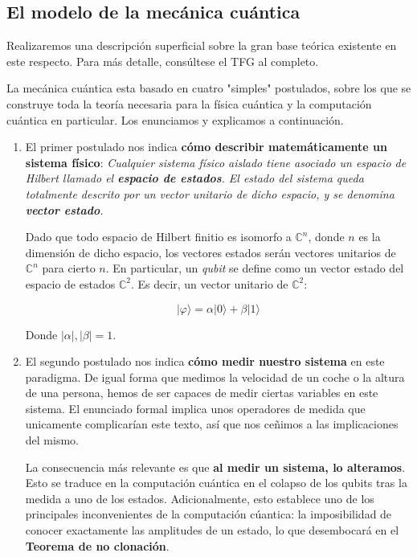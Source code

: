 \documentclass[11pt]{article}
\newcommand*{\C}{\mathds{C}}
\newcommand*{\ra}{\rangle}
\begin{document}
\subsection{El modelo de la mecánica cuántica}

Realizaremos una descripción superficial sobre la gran base teórica existente en este respecto. Para más detalle, consúltese el TFG al completo.

La mecánica cuántica esta basado en cuatro "simples" postulados, sobre los que se construye toda la teoría necesaria para la física cuántica y la computación cuántica en particular. Los enunciamos y explicamos a continuación.

\begin{enumerate}
	\item El primer postulado nos indica \textbf{cómo describir matemáticamente un sistema físico}: \emph{Cualquier sistema físico aislado tiene asociado un espacio de Hilbert llamado el \textbf{espacio de estados}. El estado del sistema queda totalmente descrito por un vector unitario de dicho espacio, y se denomina \textbf{vector estado}.}
	
	Dado que todo espacio de Hilbert finitio es isomorfo a $\C^n$, donde $n$ es la dimensión de dicho espacio, los vectores estados serán vectores unitarios de $\C^n$ para cierto $n$. En particular, un \emph{qubit} se define como un vector estado del espacio de estados $\C^2$. Es decir, un vector unitario de $\C^2$:
	
	\[ |\varphi\ra = \alpha|0\ra + \beta|1\ra \]
	
	Donde $|\alpha|, |\beta| = 1$.
	
	\item El segundo postulado nos indica \textbf{cómo medir nuestro sistema} en este paradigma. De igual forma que medimos la velocidad de un coche o la altura de una persona, hemos de ser capaces de medir ciertas variables en este sistema. El enunciado formal implica unos operadores de medida que unicamente complicarían este texto, así que nos ceñimos a las implicaciones del mismo.
	
	La consecuencia más relevante es que \textbf{al medir un sistema, lo alteramos}. Esto se traduce en la computación cuántica en el colapso de los qubits tras la medida a uno de los estados. Adicionalmente, esto establece uno de los principales inconvenientes de la computación cúantica: la imposibilidad de conocer exactamente las amplitudes de un estado, lo que desembocará en el \textbf{Teorema de no clonación}.
	

\end{enumerate}
\end{document}
